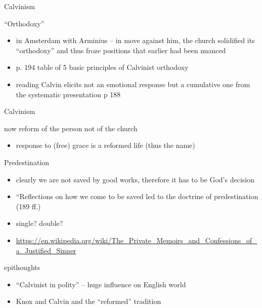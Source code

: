 \begin{frame}[label=sec-2-3]{Calvinism}
\begin{block}{``Orthodoxy''}
\begin{itemize}
\item in Amsterdam with Arminius -- in move against him, the church solidified its ``orthodoxy'' and \alert{thus froze positions that earlier had been nuanced}
\item p. 194 table of \alert{5 basic principles of Calvinist orthodoxy}
\item reading Calvin elicits not an emotional response but a cumulative one from the systematic presentation p 188
\end{itemize}
\end{block}
\end{frame}

\begin{frame}[label=sec-2-4]{Calvinism}
\begin{block}{now reform of the person not of the church}
\begin{itemize}
\item response to (free) grace is a \alert{reformed} life (thus the name)
\end{itemize}
\end{block}

\begin{block}{Predestination}
\begin{itemize}
\item clearly we are not saved by good works, therefore it has to be God's decision
\item ``Reflections on how we come to be saved led to the doctrine of predestination (189 ff.)
\item single? double?
\item \url{https://en.wikipedia.org/wiki/The_Private_Memoirs_and_Confessions_of_a_Justified_Sinner}
\end{itemize}
\end{block}
\end{frame}
\begin{frame}[label=sec-2-5]{epithoughts}
\begin{itemize}
\item ``Calvinist in polity'' -- huge influence on English world
\item Knox and Calvin and the ``reformed'' tradition
\end{itemize}
\end{frame}
